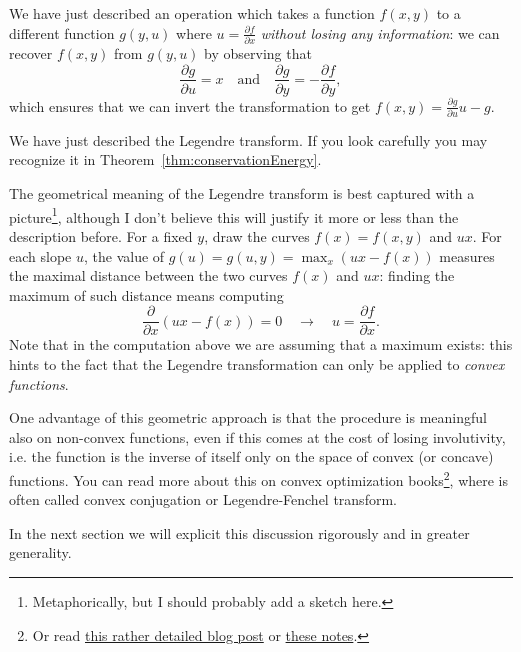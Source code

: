 \documentclass[english,fontsize=11pt,paper=b5]{scrbook}
\numberwithin{equation}{chapter}
\theoremstyle{definition}
\begin{document}
    We have just described an operation which takes a function $f(x,y)$ to a different function $g(y,u)$ where $u = \frac{\partial f}{\partial x}$ \emph{without losing any information}: we can recover $f(x,y)$ from $g(y,u)$ by observing that
    \begin{equation}
      \frac{\partial g}{\partial u} = x
      \quad\mbox{and}\quad
      \frac{\partial g}{\partial y} = - \frac{\partial f}{\partial y},
    \end{equation}
    which ensures that we can invert the transformation to get $f(x,y) = \frac{\partial g}{\partial u}u - g$.

    We have just described the Legendre transform.
    If you look carefully you may recognize it in Theorem~\ref{thm:conservationEnergy}.

    The geometrical meaning of the Legendre transform is best captured with a picture\footnote{Metaphorically, but I should probably add a sketch here.}, although I don't believe this will justify it more or less than the description before.
    For a fixed $y$, draw the curves $f(x) = f(x,y)$ and $ux$.
    For each slope $u$, the value of $g(u) = g(u,y) = \max_x (ux - f(x))$ measures the maximal distance between the two curves $f(x)$ and $ux$: finding the maximum of such distance means
    computing
    \begin{equation}
      \frac{\partial}{\partial x}(ux - f(x)) = 0 \quad\rightarrow\quad u = \frac{\partial f}{\partial x}.
    \end{equation}
    Note that in the computation above we are assuming that a maximum exists:
    this hints to the fact that the Legendre transformation can only be applied to \emph{convex functions}.

    One advantage of this geometric approach is that the procedure is meaningful also on non-convex functions, even if this comes at the cost of losing involutivity, i.e. the function is the inverse of itself only on the space of convex (or concave) functions.
    You can read more about this on convex optimization books\footnote{Or read \href{https://web.archive.org/web/20211127141805/https://jmanton.wordpress.com/2010/11/21/introduction-to-the-legendre-transform/}{this rather detailed blog post} or \href{https://web.archive.org/web/20170407134235/http://www.physics.sun.ac.za/~htouchette/archive/notes/lfth2.pdf}{these notes}.}, where is often called convex conjugation or Legendre-Fenchel transform.

    In the next section we will explicit this discussion rigorously and in greater generality.
\end{document}
